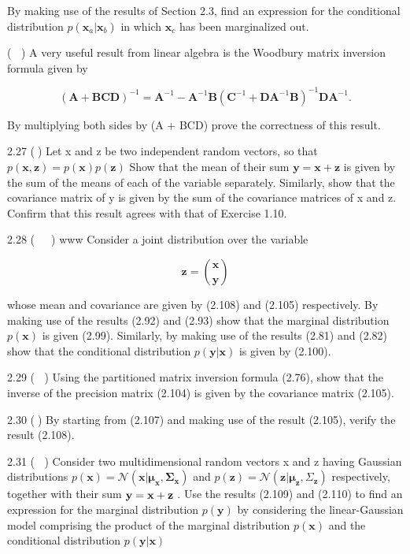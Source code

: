 \documentclass[
  10
]{article}
\begin{document}
By making use of the results of Section 2.3, find an expression for the
conditional distribution
\(p ( \mathbf { x } _ { a } | \mathbf { x } _ { b } )\) in which
\(\mathbf { x } _ { c }\) has been marginalized out.

( ) A very useful result from linear algebra is the Woodbury matrix
inversion formula given by

\[
(\mathbf {A} + \mathbf {B C D}) ^ {- 1} = \mathbf {A} ^ {- 1} - \mathbf {A} ^ {- 1} \mathbf {B} (\mathbf {C} ^ {- 1} + \mathbf {D A} ^ {- 1} \mathbf {B}) ^ {- 1} \mathbf {D A} ^ {- 1}.\tag{2.289}
\]

By multiplying both sides by (A + BCD) prove the correctness of this
result.

2.27 () Let x and z be two independent random vectors, so that
\(p ( \mathbf { x } , \mathbf { z } ) = p ( \mathbf { x } ) p ( \mathbf { z } )\)
Show that the mean of their sum
\(\mathbf { y } = \mathbf { x } + \mathbf { z }\) is given by the sum of
the means of each of the variable separately. Similarly, show that the
covariance matrix of y is given by the sum of the covariance matrices of
x and z. Confirm that this result agrees with that of Exercise 1.10.

2.28 (  ) www Consider a joint distribution over the variable

\[
\mathbf {z} = \binom{\mathbf {x}}{\mathbf {y}}\tag{2.290}
\]

whose mean and covariance are given by (2.108) and (2.105) respectively.
By making use of the results (2.92) and (2.93) show that the marginal
distribution \(p ( \mathbf { x } )\) is given (2.99). Similarly, by
making use of the results (2.81) and (2.82) show that the conditional
distribution \(p ( \mathbf { y } \vert \mathbf { x } )\) is given by
(2.100).

2.29 ( ) Using the partitioned matrix inversion formula (2.76), show
that the inverse of the precision matrix (2.104) is given by the
covariance matrix (2.105).

2.30 () By starting from (2.107) and making use of the result (2.105),
verify the result (2.108).

2.31 ( ) Consider two multidimensional random vectors x and z having
Gaussian distributions
\(p ( \mathbf { x } ) = \mathcal { N } ( \mathbf { x } | \pmb { \mu _ { \mathbf { x } } } , \pmb { \Sigma _ { \mathbf { x } } } )\)
and
\(p ( \mathbf { z } ) = \mathcal { N } ( \mathbf { z } | \boldsymbol { \mu } _ { \mathbf { z } } , \Sigma _ { \mathbf { z } } )\)
respectively, together with their sum
\({ \bf y } = { \bf x } + { \bf z }\) . Use the results (2.109) and
(2.110) to find an expression for the marginal distribution
\(p ( \mathbf { y } )\) by considering the linear-Gaussian model
comprising the product of the marginal distribution
\(p ( \mathbf { x } )\) and the conditional distribution
\(p ( \mathbf { y } \vert \mathbf { x } )\)
\end{document}
